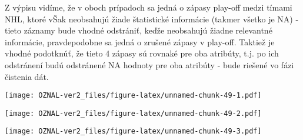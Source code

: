 \documentclass[
]{article}
\newenvironment{Shaded}{\begin{snugshade}}{\end{snugshade}}
\newcommand{\AttributeTok}[1]{\textcolor[rgb]{0.77,0.63,0.00}{#1}}
\newcommand{\FunctionTok}[1]{\textcolor[rgb]{0.00,0.00,0.00}{#1}}
\newcommand{\NormalTok}[1]{#1}
\newcommand{\SpecialCharTok}[1]{\textcolor[rgb]{0.00,0.00,0.00}{#1}}
\newcommand{\StringTok}[1]{\textcolor[rgb]{0.31,0.60,0.02}{#1}}
\begin{document}
Z výpisu vidíme, že v oboch prípadoch sa jedná o zápasy play-off medzi
tímami NHL, ktoré vŠak neobsahujú žiade štatistické informácie (takmer
všetko je NA) - tieto záznamy bude vhodné odstrániť, keďže neobsahujú
žiadne relevantné informácie, pravdepodobne sa jedná o zrušené zápasy v
play-off. Taktiež je vhodné podotknúť, že tieto 4 zápasy sú rovnaké pre
oba atribúty, t.j. po ich odstránení budú odstránené NA hodnoty pre oba
atribúty - bude riešené vo fázi čistenia dát.

\begin{Shaded}
\end{Shaded}

\texttt{[image: OZNAL-ver2\_files/figure-latex/unnamed-chunk-49-1.pdf]}

\begin{Shaded}
\end{Shaded}

\texttt{[image: OZNAL-ver2\_files/figure-latex/unnamed-chunk-49-2.pdf]}

\begin{Shaded}
\end{Shaded}

\texttt{[image: OZNAL-ver2\_files/figure-latex/unnamed-chunk-49-3.pdf]}

\begin{Shaded}
\end{Shaded}
\end{document}
